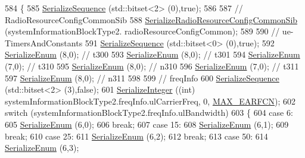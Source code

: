 \begin{DoxyCode}
584 \{
585   \hyperlink{classns3_1_1Asn1Header_aa9744858380443ed95836fed08799aed}{SerializeSequence} (std::bitset<2> (0),\textcolor{keyword}{true});
586 
587   \textcolor{comment}{// RadioResourceConfigCommonSib}
588   \hyperlink{classns3_1_1RrcAsn1Header_a84ce139dfb03bab15f1e88a495cccde0}{SerializeRadioResourceConfigCommonSib} (systemInformationBlockType2.
      radioResourceConfigCommon);
589 
590   \textcolor{comment}{// ue-TimersAndConstants}
591   \hyperlink{classns3_1_1Asn1Header_aa9744858380443ed95836fed08799aed}{SerializeSequence} (std::bitset<0> (0),\textcolor{keyword}{true});
592   \hyperlink{classns3_1_1Asn1Header_ac8e56956823ab8e4470c09e162e7bf24}{SerializeEnum} (8,0); \textcolor{comment}{// t300}
593   \hyperlink{classns3_1_1Asn1Header_ac8e56956823ab8e4470c09e162e7bf24}{SerializeEnum} (8,0); \textcolor{comment}{// t301}
594   \hyperlink{classns3_1_1Asn1Header_ac8e56956823ab8e4470c09e162e7bf24}{SerializeEnum} (7,0); \textcolor{comment}{// t310}
595   \hyperlink{classns3_1_1Asn1Header_ac8e56956823ab8e4470c09e162e7bf24}{SerializeEnum} (8,0); \textcolor{comment}{// n310}
596   \hyperlink{classns3_1_1Asn1Header_ac8e56956823ab8e4470c09e162e7bf24}{SerializeEnum} (7,0); \textcolor{comment}{// t311}
597   \hyperlink{classns3_1_1Asn1Header_ac8e56956823ab8e4470c09e162e7bf24}{SerializeEnum} (8,0); \textcolor{comment}{// n311}
598 
599   \textcolor{comment}{// freqInfo}
600   \hyperlink{classns3_1_1Asn1Header_aa9744858380443ed95836fed08799aed}{SerializeSequence} (std::bitset<2> (3),\textcolor{keyword}{false});
601   \hyperlink{classns3_1_1Asn1Header_ab1c3bd37730affa7473bc759d625c29a}{SerializeInteger} ((\textcolor{keywordtype}{int}) systemInformationBlockType2.freqInfo.ulCarrierFreq, 0, 
      \hyperlink{lte-rrc-header_8cc_a7851a91be0aab6446639f0ff8ee48b45}{MAX\_EARFCN});
602   \textcolor{keywordflow}{switch} (systemInformationBlockType2.freqInfo.ulBandwidth)
603     \{
604     \textcolor{keywordflow}{case} 6:
605       \hyperlink{classns3_1_1Asn1Header_ac8e56956823ab8e4470c09e162e7bf24}{SerializeEnum} (6,0);
606       \textcolor{keywordflow}{break};
607     \textcolor{keywordflow}{case} 15:
608       \hyperlink{classns3_1_1Asn1Header_ac8e56956823ab8e4470c09e162e7bf24}{SerializeEnum} (6,1);
609       \textcolor{keywordflow}{break};
610     \textcolor{keywordflow}{case} 25:
611       \hyperlink{classns3_1_1Asn1Header_ac8e56956823ab8e4470c09e162e7bf24}{SerializeEnum} (6,2);
612       \textcolor{keywordflow}{break};
613     \textcolor{keywordflow}{case} 50:
614       \hyperlink{classns3_1_1Asn1Header_ac8e56956823ab8e4470c09e162e7bf24}{SerializeEnum} (6,3);

\end{DoxyCode}
